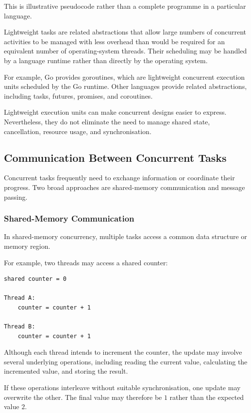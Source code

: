 This is illustrative pseudocode rather than a complete programme in a particular language.

Lightweight tasks are related abstractions that allow large numbers of concurrent activities to be managed with less overhead than would be required for an equivalent number of operating-system threads. Their scheduling may be handled by a language runtime rather than directly by the operating system.

For example, Go provides goroutines, which are lightweight concurrent execution units scheduled by the Go runtime. Other languages provide related abstractions, including tasks, futures, promises, and coroutines.

Lightweight execution units can make concurrent designs easier to express. Nevertheless, they do not eliminate the need to manage shared state, cancellation, resource usage, and synchronisation.

\subsection{Communication Between Concurrent Tasks}

Concurrent tasks frequently need to exchange information or coordinate their progress. Two broad approaches are shared-memory communication and message passing.

\subsubsection{Shared-Memory Communication}

In shared-memory concurrency, multiple tasks access a common data structure or memory region.

For example, two threads may access a shared counter:

\begin{lstlisting}
shared counter = 0

Thread A:
    counter = counter + 1

Thread B:
    counter = counter + 1
\end{lstlisting}

Although each thread intends to increment the counter, the update may involve several underlying operations, including reading the current value, calculating the incremented value, and storing the result.

If these operations interleave without suitable synchronisation, one update may overwrite the other. The final value may therefore be \(1\) rather than the expected value \(2\).

